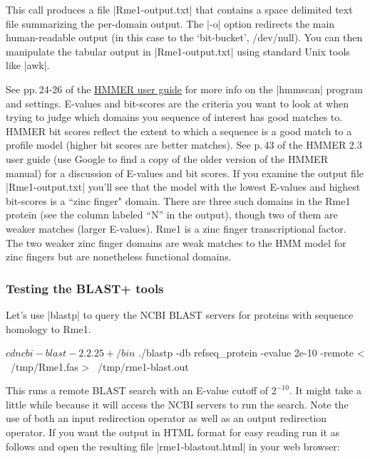 
This call produces a file |Rme1-output.txt| that contains a space delimited text file summarizing the per-domain output. The |-o| option redirects the main human-readable output (in this case to the `bit-bucket', /dev/null). You can then manipulate the tabular output in |Rme1-output.txt| using standard Unix tools like |awk|. 

See pp.\,24-26  of the \href{ftp://selab.janelia.org/pub/software/hmmer3/3.0/Userguide.pdf}{HMMER user guide} for more info on the |hmmscan| program and settings. E-values and bit-scores are the criteria you want to look at when trying to judge which domains you sequence of interest has good matches to.  HMMER bit scores reflect the extent to which a sequence is a good match to a  profile model (higher bit scores are better matches). See p.\,43 of the HMMER 2.3 user guide (use Google to find a copy of the older version of the HMMER manual) for a discussion of E-values and bit scores.  If you examine the output file |Rme1-output.txt| you'll see that the model with the lowest E-values and highest bit-scores is a ``zinc finger" domain.  There are three such domains in the Rme1 protein (see the column labeled ``N'' in the output), though two of them are weaker matches (larger E-values). Rme1 is a zinc finger transcriptional factor. The two weaker zinc finger domains are weak matches to the HMM model for zinc fingers but are nonetheless functional domains.


\subsubsection{Testing the BLAST+ tools}

Let's use |blastp| to query the NCBI BLAST servers for proteins with sequence homology to Rme1.


\begin{bash}
$ cd ncbi-blast-2.2.25+/bin
$ ./blastp -db refseq_protein -evalue 2e-10 -remote < ~/tmp/Rme1.fas > ~/tmp/rme1-blast.out
\end{bash}

This runs a remote BLAST search with an E-value cutoff of $2^{-10}$. It might take a little while because it will access the NCBI servers to run the search. Note the use of both an input redirection operator as well as an output redirection operator.  If you want the output in HTML format for easy reading run it as follows and open the resulting file |rme1-blastout.html| in  your web browser:

